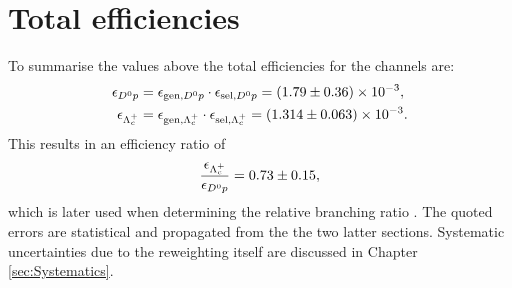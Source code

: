 \section{Total efficiencies}
To summarise the values above the total efficiencies for the channels are:
\begin{align*}
    \effDp &= \effGenDp \cdot \effSelDp = \num[scientific-notation=true]{\effDpval \pm \effDperr}, \\
    \effLc &= \effGenLc \cdot \effSelLc = \num[scientific-notation=true]{\effLcval \pm \effLcerr}.
\end{align*}
This results in an efficiency ratio of
\begin{align*}
    \frac{\effLc}{\effDp} = \effRatioval \pm \effRatioerr,
\end{align*}
which is later used when determining the relative branching ratio \R.
The quoted errors are statistical and propagated from the the two latter sections.
Systematic uncertainties due to the reweighting itself are discussed in Chapter \ref{sec:Systematics}.
